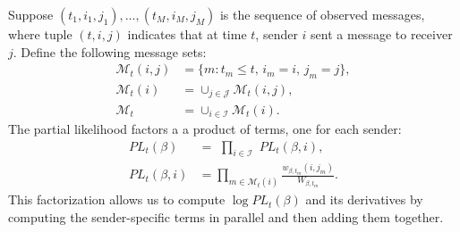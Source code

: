 \documentclass[aoas,preprint]{imsart}
\begin{document}
Suppose $(t_1, i_1, j_1), \ldots, (t_M, i_M, j_M)$ is the sequence of observed
messages, where tuple $(t,i,j)$ indicates that at time $t$, sender $i$ sent a
message to receiver $j$.  Define the following message sets:
\begin{align*}
  \mathcal{M}_t(i,j)
    &= \{ m : t_m \leq t, \, i_m = i, \, j_m = j \}, \\
  \mathcal{M}_t(i)
    &= \cup_{j \in \mathcal{J}} \mathcal{M}_t(i,j), \\
  \mathcal{M}_t
    &= \cup_{i \in \mathcal{I}} \mathcal{M}_t(i).
\end{align*}
The partial likelihood factors a a product of terms, one for each sender:
\begin{align*}
    \mathit{PL}_t(\beta)
        &=
        \,\,
        \prod_{i \in \mathcal{I}}
            \,\,
            \mathit{PL}_t(\beta, i), \\
    \mathit{PL}_t(\beta, i)
        &=
        \!\!\!\!
        \prod_{m \in \mathcal{M}_t(i)}
            \!\!\!
            \frac{w_{\beta, t_m} (i, j_m)}
                 {W_{\beta, t_m}}.
\end{align*}
This factorization allows us to compute $\log \mathit{PL}_t(\beta)$ and
its derivatives by computing the sender-specific terms in parallel and
then adding them together.
\end{document}
